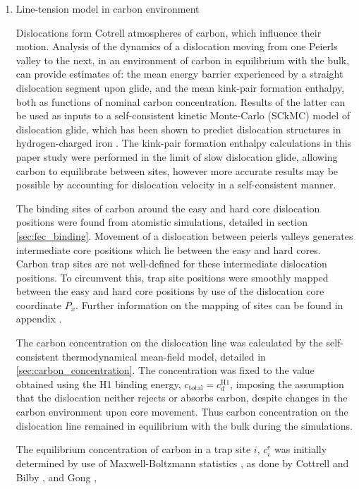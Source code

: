 \documentclass[a4paper,12pt,oneside,print,numbered,index,PageStyleIII]{PhDThesisPSnPDF}
\begin{document}
\begin{enumerate}
\item Line-tension model in carbon environment
\label{sec:org2d1054d}

Dislocations form Cotrell atmospheres of carbon, which influence their
motion. Analysis of the dynamics of a dislocation moving from one Peierls
valley to the next, in an environment of carbon in equilibrium with the
bulk, can provide estimates of: the mean energy barrier experienced by a
straight dislocation segment upon glide, and the mean kink-pair formation
enthalpy, both as functions of nominal carbon concentration. Results of the latter
can be used as inputs to a self-consistent kinetic Monte-Carlo
(SCkMC) model of dislocation glide, which has been shown to predict
dislocation structures in hydrogen-charged iron \cite{Gong2020}. The kink-pair
formation enthalpy calculations in this paper study were performed in
the limit of slow dislocation glide, allowing carbon to equilibrate between
sites, however more accurate results may be possible by accounting for
dislocation velocity in a self-consistent manner.


The binding sites of carbon around the easy and hard core dislocation
positions were found from atomistic simulations, detailed in section
\ref{sec:fec_binding}. Movement of a dislocation between peierls valleys
generates intermediate core positions which lie between the easy and hard
cores. Carbon trap sites are not well-defined for these intermediate
dislocation positions. To circumvent this, trap site positions were smoothly mapped between
the easy and hard core positions by use of the dislocation core coordinate
\(P_x\). Further information on the mapping of sites can be found in appendix
\label{sec:smoothsitemapping}.


The carbon concentration on the dislocation line was calculated by the
self-consistent thermodynamical mean-field model, detailed in
\ref{sec:carbon_concentration}. The concentration was fixed to the value
obtained using the H1 binding energy, \(c_{\text{total}} = c_d^{\text{H}1}\),
imposing the assumption that the dislocation neither rejects or absorbs
carbon, despite changes in the carbon environment upon core
movement. Thus carbon concentration on the dislocation line remained in
equilibrium with the bulk during the simulations.

The equilibrium concentration of carbon in a trap site \(i\),
\(c_{i}^{\text{e}}\) was initially determined by use of
Maxwell-Boltzmann statistics \cite{Anderson2017}, as done by Cottrell and
Bilby \cite{Cottrell1949}, and Gong \cite{Gong2020},


\end{enumerate}
\end{document}
